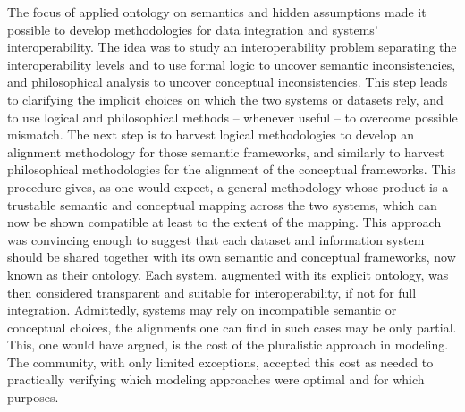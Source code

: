\documentclass[ao]{iosart2x}
\newcommand{\nb}[1]{\textcolor{red}{$|$}\marginpar{\hspace*{-0cm}\parbox{20mm}{\scriptsize\raggedright\textcolor{red}{#1}}}}
\begin{document}
The focus of applied ontology on semantics and hidden assumptions made it possible to develop methodologies for data integration and systems' interoperability. The idea was to study an interoperability problem separating the interoperability levels and to use formal logic to uncover semantic inconsistencies, and philosophical analysis to uncover conceptual inconsistencies. 
This step leads to clarifying the implicit choices on which the two systems or datasets rely, and to use logical and philosophical methods -- whenever useful -- to overcome possible mismatch. The next step is to harvest logical methodologies to develop an alignment methodology for those semantic frameworks, and similarly to harvest philosophical methodologies for the alignment of the conceptual frameworks. 
This procedure gives, as one would expect, a general methodology whose product is a trustable semantic and conceptual mapping across the two systems, which can now be shown compatible at least to the extent of the mapping.
This approach was convincing enough to suggest that each dataset and information system should be shared together with its own semantic and conceptual frameworks, now known as their ontology. Each system, augmented with its explicit ontology, was then considered transparent and suitable for interoperability, if not for full integration. 
Admittedly, systems may rely on incompatible semantic or conceptual choices, the alignments one can find in such cases may be only partial. This, one would have argued, is the cost of the pluralistic approach in modeling. The community, with only limited exceptions, accepted this cost as needed to practically verifying which modeling approaches were optimal and for which purposes.
\end{document}
